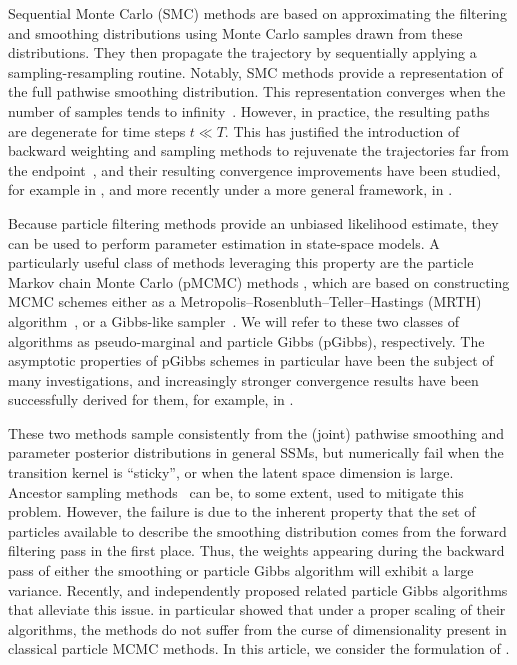 Sequential Monte Carlo (SMC) methods \citep[see, e.g.,][]{Chopin2020book} are based on approximating the filtering and smoothing distributions using Monte Carlo samples drawn from these distributions. They then propagate the trajectory by sequentially applying a sampling-resampling routine. Notably, SMC methods \citep[aside from the family of marginal particle filtering methods, see,][]{Klaas2005marginal} provide a representation of the full pathwise smoothing distribution. This representation converges when the number of samples tends to infinity~\citep{kitagawa1996smoothing}. However, in practice, the resulting paths are degenerate for time steps $t \ll T$. This has justified the introduction of backward weighting and sampling methods to rejuvenate the trajectories far from the endpoint~\citep{godsill2004monte}, and their resulting convergence improvements have been studied, for example in \citet{douc2011sequential}, and more recently under a more general framework, in \citet{Dau2022complexity}. %

Because particle filtering methods provide an unbiased likelihood estimate, they can be used to perform parameter estimation in state-space models. A particularly useful class of methods leveraging this property are the particle Markov chain Monte Carlo (pMCMC) methods \citep{andrieu2009pseudomarginal,Andrieu2010particle}, which are based on constructing MCMC schemes either as a Metropolis--Rosenbluth--Teller--Hastings (MRTH) algorithm~\citep{metropolis1953equation,Hastings:1970}, or a Gibbs-like sampler~\citep{geman1984stochastic}. We will refer to these two classes of algorithms as pseudo-marginal and particle Gibbs (pGibbs), respectively. The asymptotic properties of pGibbs schemes in particular have been the subject of many investigations, and increasingly stronger convergence results have been successfully derived for them, for example, in \citet{Chopin2015particle,andrieu2018uniform,lee2020coupled}.

These two methods sample consistently from the (joint) pathwise smoothing and parameter posterior distributions in general SSMs, but numerically fail when the transition kernel is ``sticky'', or when the latent space dimension is large. Ancestor sampling methods~\citep{whiteley2010discussion,lindsten2014particle} can be, to some extent, used to mitigate this problem. However, the failure is due to the inherent property that the set of particles available to describe the smoothing distribution comes from the forward filtering pass in the first place. Thus, the weights appearing during the backward pass of either the smoothing or particle Gibbs algorithm will exhibit a large variance. Recently, \citet{finke2021csmc} and \citet[Chap. 4]{malory2021bayesian} independently proposed related particle Gibbs algorithms that alleviate this issue. \citet{finke2021csmc} in particular showed that under a proper scaling of their algorithms, the methods do not suffer from the curse of dimensionality present in classical particle MCMC methods. In this article, we consider the formulation of \citet{finke2021csmc}.


